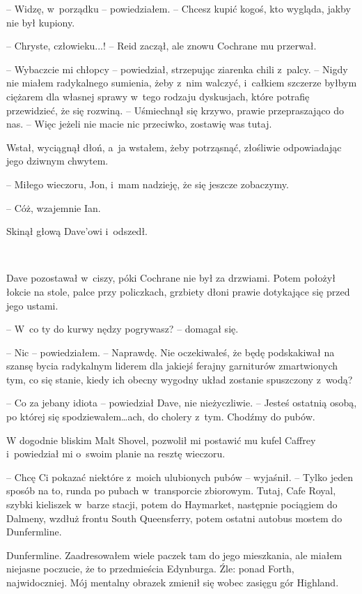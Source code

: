 \documentclass[oneside,polish,11pt,sfheadings]{mwbk}
\begin{document}
-- Widzę, w~porządku -- powiedziałem. -- Chcesz kupić kogoś, kto wygląda,
jakby nie był kupiony.

-- Chryste, człowieku...! -- Reid zaczął, ale znowu Cochrane mu przerwał.

-- Wybaczcie mi chłopcy -- powiedział, strzepując ziarenka chili z~palcy.
-- Nigdy nie miałem radykalnego sumienia, żeby z~nim walczyć, i~całkiem
szczerze byłbym ciężarem dla własnej sprawy w~tego rodzaju dyskusjach,
które potrafię przewidzieć, że się rozwiną. -- Uśmiechnął się krzywo,
prawie przepraszająco do nas. -- Więc jeżeli nie macie nic przeciwko,
zostawię was tutaj.

Wstał, wyciągnął dłoń, a~ja wstałem, żeby potrząsnąć, złośliwie
odpowiadając jego dziwnym chwytem. 

-- Miłego wieczoru, Jon, i~mam
nadzieję, że się jeszcze zobaczymy.

-- Cóż, wzajemnie Ian.

Skinął głową Dave'owi i~odszedł.

~

Dave pozostawał w~ciszy, póki Cochrane nie był za drzwiami. Potem
położył łokcie na stole, palce przy policzkach, grzbiety dłoni prawie
dotykające się przed jego ustami.

-- W~co ty do kurwy nędzy pogrywasz? -- domagał się.

-- Nic -- powiedziałem. -- Naprawdę. Nie oczekiwałeś, że będę podskakiwał
na szansę bycia radykalnym liderem dla jakiejś ferajny garniturów
zmartwionych tym, co się stanie, kiedy ich obecny wygodny układ zostanie
spuszczony z~wodą?

-- Co za jebany idiota -- powiedział Dave, nie nieżyczliwie. -- Jesteś
ostatnią osobą, po której się spodziewałem\ldots ach, do cholery z~tym.
Chodźmy do pubów.

W dogodnie bliskim Malt Shovel, pozwolił mi postawić mu kufel Caffrey i~powiedział mi o~swoim planie na resztę wieczoru.

-- Chcę Ci pokazać niektóre z~moich ulubionych pubów -- wyjaśnił. -- Tylko
jeden sposób na to, runda po pubach w~transporcie zbiorowym. Tutaj, Cafe
Royal, szybki kieliszek w~barze stacji, potem do Haymarket, następnie
pociągiem do Dalmeny, wzdłuż frontu South Queensferry, potem ostatni
autobus mostem do Dunfermline.

Dunfermline. Zaadresowałem wiele paczek tam do jego mieszkania, ale
miałem niejasne poczucie, że to przedmieścia Edynburga. Źle: ponad
Forth, najwidoczniej. Mój mentalny obrazek zmienił się wobec zasięgu gór
Highland.
\end{document}
